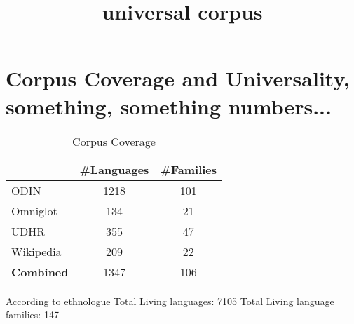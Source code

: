 \documentclass[11pt]{article}
\title{\textbf{universal corpus}}
\date{}
\begin{document}
\maketitle

\section{Corpus Coverage and Universality, something, something numbers...}

\begin{table}
\centering
    \begin{tabular}{l|cc}
    ~         				& \#Languages & \#Families \\ \hline
    ODIN      				& 1218       & 101       \\
    Omniglot  				& 134        & 21        \\
    UDHR      				& 355        & 47        \\
    Wikipedia 				& 209        & 22       \\ \hline
    \textbf{Combined}	& 1347			 & 106 
    \end{tabular}
\caption{Corpus Coverage}
\end{table}

According to ethnologue
Total Living languages: 7105
Total Living language families: 147
\end{document}
